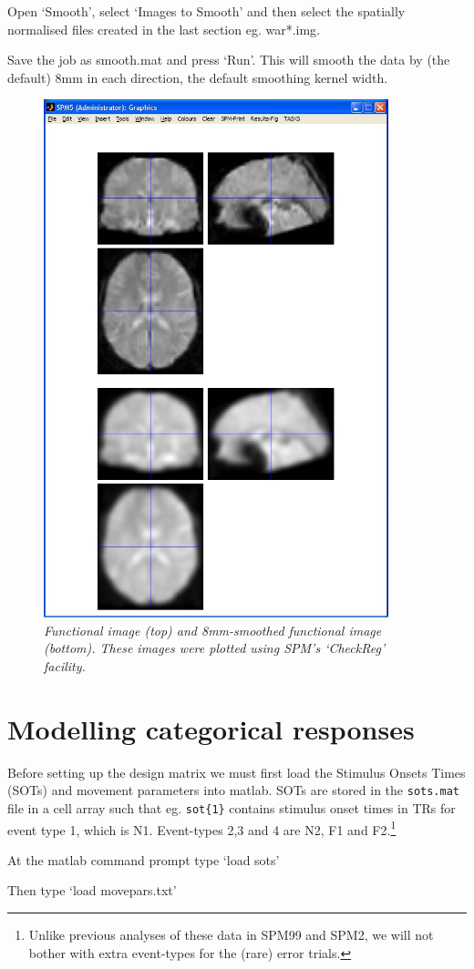 \bi
\item{Open `Smooth', select `Images to Smooth' and then 
select the spatially normalised files created in the 
last section eg. {\sf war*.img}. }
\item{Save the job as {\sf smooth.mat} and press `Run'.}
\ei
This will smooth the data by (the default) 8mm in each direction, 
the default smoothing kernel width.
\begin{figure}
\begin{center}
\includegraphics[width=100mm]{faces/smooth}
\caption{\em Functional image (top) and 8mm-smoothed functional image (bottom). These images were plotted using SPM's `CheckReg' facility. \label{face_smooth}}
\end{center}
\end{figure}

\section{Modelling categorical responses}

Before setting up the design matrix we must first 
load the Stimulus Onsets Times (SOTs) and movement
parameters into matlab. SOTs are stored in the 
\verb!sots.mat! file in a 
cell array such that eg. \verb!sot{1}! contains 
stimulus onset times in TRs for event type 1, which is N1. Event-types 2,3 and 4 are N2, F1 and F2.\footnote{Unlike previous analyses of these data in SPM99 and SPM2, we will not bother with extra event-types for the (rare) error trials.}
\bi
\item{At the matlab command prompt type `load sots'}
\item{Then type `load movepars.txt'}
\ei

